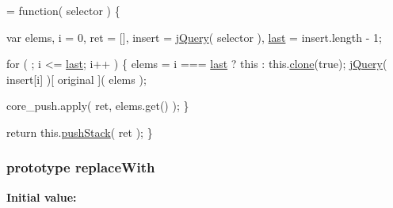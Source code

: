 \begin{DoxyCode}
= \textcolor{keyword}{function}( selector ) \{


        var elems,
            i = 0,
            ret = [],
            insert = \hyperlink{jquery-1_810_82-vsdoc_8js_add5237586d970a38a81f990e8eb28c6c}{jQuery}( selector ),
            \hyperlink{jquery-1_810_82-vsdoc_8js_a5a9684d230de11a6ec3029bcce128977}{last} = insert.length - 1;

        \textcolor{keywordflow}{for} ( ; i <= \hyperlink{jquery-1_810_82-vsdoc_8js_a5a9684d230de11a6ec3029bcce128977}{last}; i++ ) \{
            elems = i === \hyperlink{jquery-1_810_82-vsdoc_8js_a5a9684d230de11a6ec3029bcce128977}{last} ? \textcolor{keyword}{this} : this.\hyperlink{jquery-1_810_82-vsdoc_8js_a7d74ce76585989b4b6e2d506577e13ad}{clone}(\textcolor{keyword}{true});
            \hyperlink{jquery-1_810_82-vsdoc_8js_add5237586d970a38a81f990e8eb28c6c}{jQuery}( insert[i] )[ original ]( elems );

            
            core\_push.apply( ret, elems.get() );
        \}

        \textcolor{keywordflow}{return} this.\hyperlink{jquery-1_810_82-vsdoc_8js_afc3a7db1ef2b526338c06c07cecccd44}{pushStack}( ret );
    \}
\end{DoxyCode}
\hypertarget{jquery-1_810_82-vsdoc_8js_adefc41a8d3d9f7f534df4b2171d70141}{
\subsubsection[{replace\-With}]{ {\bf prototype} replace\-With}}\label{jquery-1_810_82-vsdoc_8js_adefc41a8d3d9f7f534df4b2171d70141}
{\bfseries Initial value\-:}
